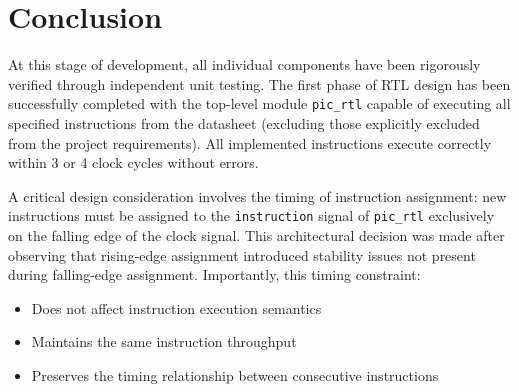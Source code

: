 \section*{Conclusion}
At this stage of development, all individual components have been rigorously
verified through independent unit testing. The first phase of RTL design has
been successfully completed with the top-level module \texttt{pic\_rtl} capable of executing all specified instructions from the datasheet (excluding those explicitly excluded from the project requirements). All implemented instructions execute correctly within 3 or 4 clock cycles without errors.

A critical design consideration involves the timing of instruction assignment:
new instructions must be assigned to the \texttt{instruction} signal of
\texttt{pic\_rtl} exclusively on the falling edge of the clock signal. This architectural decision was made after observing that rising-edge assignment introduced stability issues not present during falling-edge assignment. Importantly, this timing constraint:

\begin{itemize}
\item Does not affect instruction execution semantics
\item Maintains the same instruction throughput
\item Preserves the timing relationship between consecutive instructions
\end{itemize}
